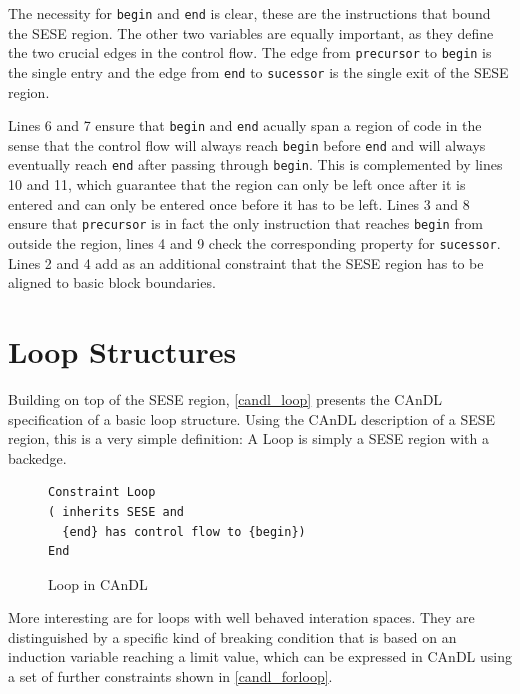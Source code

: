     The necessity for {\tt begin} and {\tt end} is clear, these are the
    instructions that bound the SESE region.
    The other two variables are equally important, as they define the two
    crucial edges in the control flow.
    The edge from {\tt precursor} to {\tt begin} is the
    single entry and the edge from {\tt end} to {\tt sucessor} is the single
    exit of the SESE region.

    Lines 6 and 7 ensure that {\tt begin} and {\tt end} acually span a region of
    code in the sense that the control flow will always reach {\tt begin} before
    {\tt end} and will always eventually reach {\tt end} after passing through
    {\tt begin}.
    This is complemented by lines 10 and 11, which guarantee that the region can
    only be left once after it is entered and can only be entered once before it
    has to be left.
    Lines 3 and 8 ensure that {\tt precursor} is in fact the only instruction
    that reaches {\tt begin} from outside the region, lines 4 and 9 check the
    corresponding property for {\tt sucessor}.
    Lines 2 and 4 add as an additional constraint that the SESE region has to be
    aligned to basic block boundaries.

\section{Loop Structures}
    Building on top of the SESE region, \autoref{candl_loop} presents the CAnDL
    specification of a basic loop structure.
    Using the CAnDL description of a SESE region, this is a very simple
    definition: A Loop is simply a SESE region with a backedge.

\begin{figure}[h]
\begin{lstlisting}[language=CAnDL]
Constraint Loop
( inherits SESE and
  {end} has control flow to {begin})
End
\end{lstlisting}
\caption{Loop in CAnDL}
\label{candl_loop}
\end{figure}

    More interesting are for loops with well behaved interation spaces.
    They are distinguished by a specific kind of breaking condition that is
    based on an induction variable reaching a limit value, which can be
    expressed in CAnDL using a set of further constraints shown in
    \autoref{candl_forloop}.

